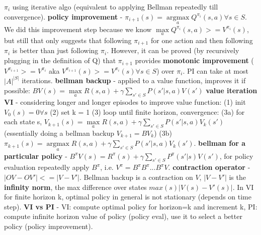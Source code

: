 \documentclass{article}
\begin{document}
\begin{itemize}
$\pi_i$ using iterative algo (equivalent to applying Bellman repeatedly till convergence). \textbf{policy improvement} - $\pi_{i+1}(s) = \underset{a}{\operatorname{argmax}} Q^{\pi_i}(s, a) \forall s \in S$. We did this improvement step because we know $\underset{a}{\operatorname{max}} Q^{\pi_i}(s, a) >= V^{\pi_i}(s)$, but still that only suggests that following $\pi_{i+1}$ for one action and then following $\pi_i$ is better than just following $\pi_i$. However, it can be proved (by recursively plugging in the definition of Q) that $\pi_{i+1}$ provides \textbf{monotonic improvement} ($V^{\pi_{i+1}} >= V^{\pi_i}$ aka $V^{\pi_{i+1}}(s) >= V^{\pi_i}(s) \forall s \in S$) over $\pi_i$. PI can take at most $|A|^{|S|}$ iterations. \textbf{bellman backup} - applied to a value function, improves it if possible: $BV(s) = \underset{a}{\operatorname{max}} R(s, a) + \gamma \sum \limits_{s' \in S} P(s' | s, a) V(s') $ \textbf{value iteration VI} - considering longer and longer episodes to improve value function: (1) init $V_0(s) = 0 \forall s$ (2) set k = 1 (3) loop until finite horizon, convergence: (3a) for each state s, $V_{k+1}(s) = \underset{a}{\operatorname{max}} R(s, a) + \gamma \sum \limits_{s' \in S} P(s' | s, a) V_k(s')$ (essentially doing a bellman backup $V_{k+1} = BV_k$) (3b) $\pi_{k+1}(s) = \underset{a}{\operatorname{argmax}} R(s, a) + \gamma \sum \limits_{s' \in S} P(s' | s, a) V_k(s')$. \textbf{bellman for a particular policy} - $B^{\pi}V(s) = R^\pi(s) + \gamma \sum \limits_{s' \in S} P^\pi(s' | s) V(s') $, for policy evaluation repeatedly apply $B^\pi$, i.e. $V^\pi = B^\pi B^\pi ... B^\pi V$. \textbf{contraction operator} - $|OV - OV'| <= |V-V'|$. Bellman backup is a contraction on $V$, $|V-V'|$ is the \textbf{infinity norm}, the max difference over states $max(s) |V(s) - V'(s)|$. In VI for finite horizon k, optimal policy in general is not stationary (depends on time step). \textbf{VI vs PI} - VI: compute optimal policy for horizon=k and increment k, PI: compute infinite horizon value of policy (policy eval), use it to select a better policy (policy improvement).

\end{itemize}
\end{document}
